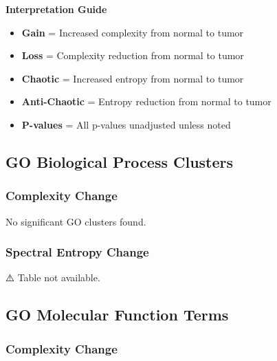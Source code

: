 \documentclass[
  letterpaper,
  DIV=11,
  numbers=noendperiod,
  openany,
  oneside]{scrreprt}
\providecommand{\tightlist}{%
  \setlength{\itemsep}{0pt}\setlength{\parskip}{0pt}}
\begin{document}
\begin{tcolorbox}[enhanced jigsaw, opacityback=0, colframe=quarto-callout-note-color-frame, toptitle=1mm, colback=white, breakable, toprule=.15mm, bottomrule=.15mm, opacitybacktitle=0.6, title=\textcolor{quarto-callout-note-color}{\faInfo}\hspace{0.5em}{Note}, coltitle=black, rightrule=.15mm, leftrule=.75mm, left=2mm, bottomtitle=1mm, titlerule=0mm, colbacktitle=quarto-callout-note-color!10!white, arc=.35mm]

\textbf{Interpretation Guide}

\begin{itemize}
\tightlist
\item
  \textbf{Gain} = Increased complexity from normal to tumor
\item
  \textbf{Loss} = Complexity reduction from normal to tumor
\item
  \textbf{Chaotic} = Increased entropy from normal to tumor
\item
  \textbf{Anti-Chaotic} = Entropy reduction from normal to tumor
\item
  \textbf{P-values} = All p-values unadjusted unless noted
\end{itemize}

\end{tcolorbox}

\subsection{GO Biological Process Clusters}

\subsubsection{Complexity Change}

No significant GO clusters found.

\subsubsection{Spectral Entropy Change}

⚠️ Table not available.

\subsection{GO Molecular Function Terms}

\subsubsection{Complexity Change}
\end{document}
